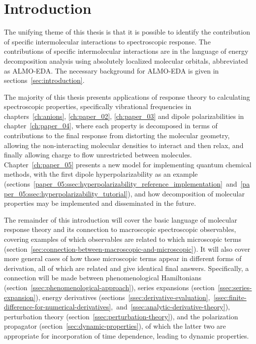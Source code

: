 \documentclass[%
class = book,%
crop = false,%
float = true,%
multi = true,%
preview = false,%
]{standalone}
\begin{document}
\onlyifstandalone{\tableofcontents}
\onlyifstandalone{\listoffixmes}
\chapter{Introduction}
\label{ch:introduction}

The unifying theme of this thesis is that it is possible to identify the contribution of specific intermolecular interactions to spectroscopic response. The contributions of specific intermolecular interactions are in the language of energy decomposition analysis using absolutely localized molecular orbitals, abbreviated as ALMO-EDA. The necessary background for ALMO-EDA is given in sections~\ref{sec:introduction}.

The majority of this thesis presents applications of response theory to calculating spectroscopic properties, specifically vibrational frequencies in chapters~\ref{ch:anions}, \ref{ch:paper_02}, \ref{ch:paper_03} and dipole polarizabilities in chapter~\ref{ch:paper_04}, where each property is decomposed in terms of contributions to the final response from distorting the molecular geometry, allowing the non-interacting molecular densities to interact and then relax, and finally allowing charge to flow unrestricted between molecules. Chapter~\ref{ch:paper_05} presents a new model for implementing quantum chemical methods, with the first dipole hyperpolarizability as an example (sections~\ref{paper_05:ssec:hyperpolarizability_reference_implementation}~and~\ref{paper_05:ssec:hyperpolarizability_tutorial}), and how decomposition of molecular properties may be implemented and disseminated in the future.

The remainder of this introduction will cover the basic language of molecular response theory and its connection to macroscopic spectroscopic observables, covering examples of which observables are related to which microscopic terms (section~\ref{sec:connection-between-macroscopic-and-microscopic}). It will also cover more general cases of how those microscopic terms appear in different forms of derivation, all of which are related and give identical final answers. Specifically, a connection will be made between phenomenological Hamiltonians (section~\ref{ssec:phenomenological-approach}), series expansions (section~\ref{ssec:series-expansion}), energy derivatives (sections~\ref{ssec:derivative-evaluation},~\ref{ssec:finite-difference-for-numerical-derivatives},~and~\ref{ssec:analytic-derivative-theory}), perturbation theory (section~\ref{ssec:perturbation-theory}), and the polarization propagator (section~\ref{sec:dynamic-properties}), of which the latter two are appropriate for incorporation of time dependence, leading to dynamic properties.
\end{document}

